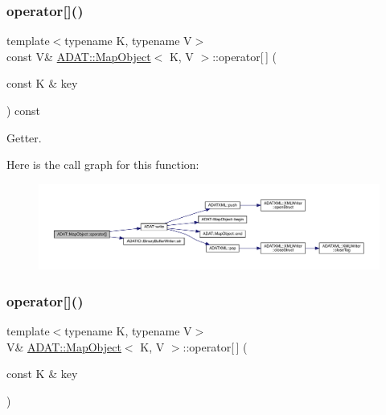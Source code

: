 \subsubsection{\texorpdfstring{operator[]()}{operator[]()}\hspace{0.1cm}{\footnotesize\ttfamily [2/4]}}
{\footnotesize\ttfamily template$<$typename K, typename V$>$ \\
const V\& \mbox{\hyperlink{classADAT_1_1MapObject}{A\+D\+A\+T\+::\+Map\+Object}}$<$ K, V $>$\+::operator\mbox{[}$\,$\mbox{]} (\begin{DoxyParamCaption}\item[{const K \&}]{key }\end{DoxyParamCaption}) const\hspace{0.3cm}{\ttfamily [inline]}}



Getter. 

Here is the call graph for this function\+:
\nopagebreak
\begin{figure}[H]
\begin{center}
\leavevmode
\includegraphics[width=350pt]{da/d29/classADAT_1_1MapObject_adb014dc7d3ef80a73fd1734e818eeef4_cgraph}
\end{center}
\end{figure}
\mbox{\label{classADAT_1_1MapObject_ab6ac0d8eccffc7975fd329649dd6f9e7}} 
\subsubsection{\texorpdfstring{operator[]()}{operator[]()}\hspace{0.1cm}{\footnotesize\ttfamily [3/4]}}
{\footnotesize\ttfamily template$<$typename K, typename V$>$ \\
V\& \mbox{\hyperlink{classADAT_1_1MapObject}{A\+D\+A\+T\+::\+Map\+Object}}$<$ K, V $>$\+::operator\mbox{[}$\,$\mbox{]} (\begin{DoxyParamCaption}\item[{const K \&}]{key }\end{DoxyParamCaption})\hspace{0.3cm}{\ttfamily [inline]}}



